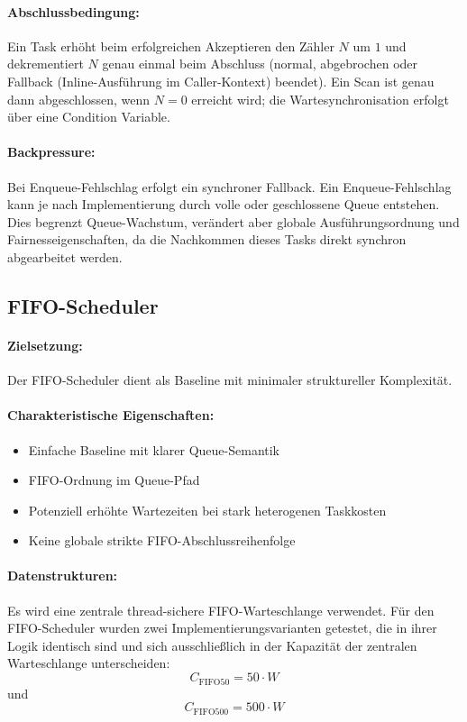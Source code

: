 \begin{sloppypar}
\paragraph{Abschlussbedingung:}
Ein Task erhöht beim erfolgreichen Akzeptieren den Zähler $N$ um $1$ und dekrementiert $N$ genau einmal beim Abschluss (normal, abgebrochen oder Fallback (Inline-Ausführung im Caller-Kontext) beendet).
Ein Scan ist genau dann abgeschlossen, wenn $N=0$ erreicht wird; die Wartesynchronisation erfolgt über eine Condition Variable.

\paragraph{Backpressure:}
Bei Enqueue-Fehlschlag erfolgt ein synchroner Fallback.
Ein Enqueue-Fehlschlag kann je nach Implementierung durch volle oder geschlossene Queue entstehen.
Dies begrenzt Queue-Wachstum, verändert aber globale Ausführungsordnung und Fairnesseigenschaften, 
da die Nachkommen dieses Tasks direkt synchron abgearbeitet werden.

\subsection{\acs{FIFO}-Scheduler}

\paragraph{Zielsetzung:}
Der \acs{FIFO}-Scheduler dient als Baseline mit minimaler struktureller Komplexität.

\paragraph{Charakteristische Eigenschaften:}
\begin{itemize}
\item Einfache Baseline mit klarer Queue-Semantik
\item \acs{FIFO}-Ordnung im Queue-Pfad
\item Potenziell erhöhte Wartezeiten bei stark heterogenen Taskkosten
\item Keine globale strikte \acs{FIFO}-Abschlussreihenfolge
\end{itemize}

\paragraph{Datenstrukturen:}
Es wird eine zentrale thread-sichere \acs{FIFO}-Warteschlange verwendet.
Für den \acs{FIFO}-Scheduler wurden zwei Implementierungsvarianten getestet, 
die in ihrer Logik identisch sind und sich ausschließlich in der Kapazität der zentralen Warteschlange unterscheiden:
\[
C_{\mathrm{FIFO50}}=50\cdot W
\]
und
\[
C_{\mathrm{FIFO500}}=500\cdot W
\]


\end{sloppypar}
